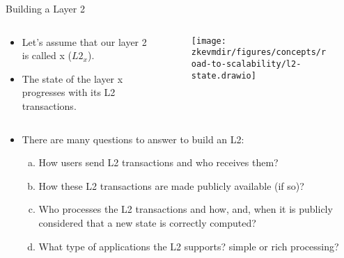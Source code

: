 \begin{frame}{Building a Layer 2}
\begin{columns}
\begin{column}{0.35\textwidth}
\begin{itemize}
\item Let's assume that our layer 2 is called x ($L2_x$).
\item The state of the layer x progresses with its L2 transactions.
\end{itemize}
\end{column}
\begin{column}{0.65\textwidth}
\begin{figure}
\texttt{[image: \\zkevmdir/figures/concepts/road-to-scalability/l2-state.drawio]}
\end{figure}
\end{column}
\end{columns}

\begin{itemize}
\item There are many questions to answer to build an L2:
  \begin{enumerate}[a)]
  \item How users send L2 transactions and who receives them?
  \item How these L2 transactions are made publicly available (if so)?
  \item Who processes the L2 transactions and how, and, when 
  it is publicly considered that a new state is correctly computed?
  \item What type of applications the L2 supports? simple or rich processing?
  \end{enumerate}
\end{itemize}
\end{frame}